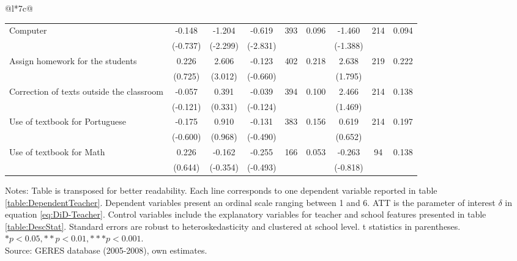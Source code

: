 \documentclass[a4paper, 12pt]{article}
\newcommand{\sym}[1]{\rlap{#1}}%
\begin{document}
\begin{longtable}{@{\extracolsep{1pt}}l*{7}{c}@{}}
\begin{adjustbox}{max width=\textwidth}
\begin{tabular}{l*{8}{c}}
Computer     &      -0.148         &      -1.204\sym{*}  &      -0.619\sym{**} &   393     &     0.096     &       -1.460         &       214        &        0.094   \\
            &     (-0.737)         &     (-2.299)         &     (-2.831)         &             &       &     (-1.388)                 \\
Assign homework for the students     &       0.226         &       2.606\sym{**} &      -0.123         &       402         &      0.218    &       2.638         &       219        &       0.222    \\
            &     (0.725)         &     (3.012)         &     (-0.660)         &             &        &     (1.795)                \\
Correction of texts outside the classroom      &     -0.057         &       0.391         &     -0.039         &     394         &  0.100   &       2.466         &       214        &    0.138      \\
            &     (-0.121)         &     (0.331)         &     (-0.124)         &              &     &     (1.469)                   \\
Use of textbook for Portuguese     &      -0.175         &       0.910         &      -0.131         &     383         &     0.156     &       0.619         &       214        &     0.197      \\
            &     (-0.600)         &     (0.968)         &     (-0.490)         &             &        &     (0.652)                \\
Use of textbook for Math     &       0.226         &      -0.162         &      -0.255         &      166         &     0.053      &       -0.263         &       94        &        0.138   \\
            &     (0.644)         &     (-0.354)         &     (-0.493)         &              &        &     (-0.818)                \\
\bottomrule     
\end{tabular}                      
\end{adjustbox}   \medskip           
\end{longtable}
\vspace{-17pt}
\begin{minipage}{1\textwidth}            \scriptsize Notes: Table is transposed for better readability. Each line corresponds to one dependent variable reported in table \ref{table:DependentTeacher}. Dependent variables present an ordinal scale ranging between 1 and 6. ATT is the parameter of interest $\delta$ in equation \eqref{eq:DiD-Teacher}. Control variables include the explanatory variables for teacher and school features presented in table \ref{table:DescStat}. Standard errors are robust to heteroskedasticity and clustered at school level. t statistics in parentheses. \( * p<0.05, ** p<0.01, *** p<0.001 \).\\                    
Source: GERES database (2005-2008), own estimates.            
\end{minipage}                         
\end{document}
